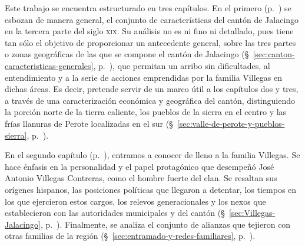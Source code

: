 \documentclass[14pt,twoside,final]{extbook} %
\begin{document}
Este trabajo se encuentra estructurado en tres capítulos. En el primero (p.~\pageref{ch:capitulo-uno}) se esbozan de manera general, el conjunto de características del cantón de Jalacingo en la tercera parte del siglo \textsc{xix}. Su análisis no es ni fino ni detallado, pues tiene tan sólo el objetivo de proporcionar un antecedente general, sobre las tres partes o zonas geográficas de las que se compone el cantón de Jalacingo (\S~\ref{sec:canton-caracteristicas-generales}, p.~\pageref{sec:canton-caracteristicas-generales}), que permitan un arribo sin dificultades, al entendimiento y a la serie de acciones emprendidas por la familia Villegas en dichas áreas. Es decir, pretende servir de un marco útil a los capítulos dos y tres, a través de una caracterización económica y geográfica del cantón, distinguiendo la porción norte de la tierra caliente, los pueblos de la sierra en el centro y las frías llanuras de Perote localizadas en el sur (\S~\ref{sec:valle-de-perote-y-pueblos-sierra}, p.~\pageref{sec:valle-de-perote-y-pueblos-sierra}).

En el segundo capítulo (p.~\pageref{ch:capitulo-dos}), entramos a conocer de lleno a la familia Villegas. Se hace énfasis en la personalidad y el papel protagónico que desempeñó José Antonio Villegas Contreras, como el hombre fuerte del clan. Se resaltan sus orígenes hispanos, las posiciones políticas que llegaron a detentar, los tiempos en los que ejercieron estos cargos, los relevos generacionales y los nexos que establecieron con las autoridades municipales y del cantón (\S~\ref{sec:Villegas-Jalacingo}, p.~\pageref{sec:Villegas-Jalacingo}). Finalmente, se analiza el conjunto de alianzas que tejieron con otras familias de la región (\S~\ref{sec:entramado-y-redes-familiares}, p.~\pageref{sec:entramado-y-redes-familiares}).
\end{document}
